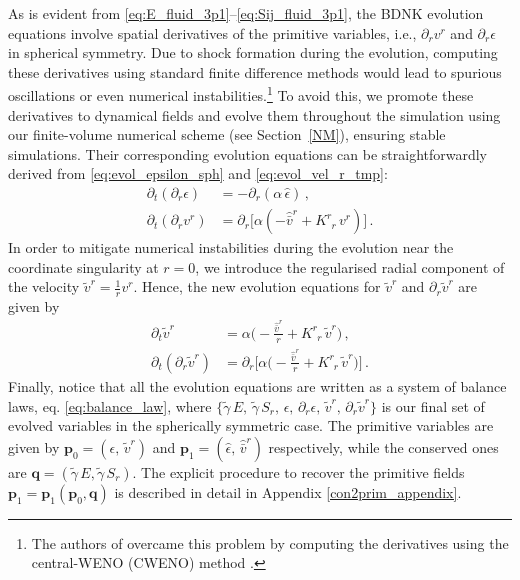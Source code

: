 \documentclass[prd,aps,twocolumn,floats,floatfix,nofootinbib,superscriptaddress] {revtex4-1}
\begin{document}
As is evident from \eqref{eq:E_fluid_3p1}--\eqref{eq:Sij_fluid_3p1}, the BDNK evolution equations involve spatial derivatives of the primitive variables, i.e.,  $\partial_rv^r$ and $\partial_r \epsilon$ in spherical symmetry.  Due to shock formation during the evolution, computing these derivatives using standard finite difference methods would lead to spurious oscillations or even numerical instabilities.\footnote{The authors of \cite{Pandya:2022pif} overcame this problem by computing the derivatives using the central-WENO (CWENO) method \cite{refId0}.} To avoid this, we promote these derivatives to dynamical fields and evolve them throughout the simulation using our finite-volume numerical scheme (see Section~\ref{NM}), ensuring stable simulations.
Their corresponding evolution equations can be straightforwardly derived from \eqref{eq:evol_epsilon_sph} and \eqref{eq:evol_vel_r_tmp}:
\begin{align}
    \partial_t(\partial_r\epsilon) &=-\partial_r(\alpha\,\hat\epsilon)\,,\\
    \partial_t (\partial_rv^r) &=\partial_r\big[\alpha(-\hat{\bar v}^r+K^r_{\phantom{r}r}\,v^r)\big]\,.
\end{align}
In order to mitigate numerical instabilities during the evolution near the coordinate singularity at $r=0$, we introduce the regularised radial component of the velocity $\tilde{v}^r=\frac{1}{r}v^r$. Hence, the new evolution equations for $\tilde{v}^r$ and $\partial_r \tilde{v}^r$ are given by
\begin{align}
    \partial_t \tilde{v}^r &=\alpha\big(-\tfrac{\hat{\bar v}^r}{r}+K^r_{\phantom{r}r}\,\tilde{v}^r\big)\,, \label{eq:evol_vel_r}\\
    \partial_t (\partial_r \tilde{v}^r) &=\partial_r\big[\alpha\big(-\tfrac{\hat{\bar v}^r}{r}+K^r_{\phantom{r}r}\,\tilde{v}^r\big)\big]\,.
\end{align} 
Finally, notice that all the evolution equations are written as a system of balance laws, eq. \eqref{eq:balance_law},
where $\{\tilde{\gamma}\,E,\,\tilde{\gamma}\,S_{r},\,\epsilon,\,\partial_{r}\epsilon,\,\tilde{v}^r, \,\partial_{r}\tilde{v}^r\}$ is our final set of evolved variables in the spherically symmetric case. The primitive variables are given by $\mathbf{p}_0=(\epsilon,\,\tilde{v}^r)$ and $\mathbf{p}_1=(\hat{\epsilon},\,\hat{\bar v}^r)$ respectively, while the conserved ones are $\mathbf{q}=(\tilde{\gamma}\,E,\tilde{\gamma}\,S_{r})$. The explicit procedure to recover the primitive fields $\mathbf{p}_1 = \mathbf{p}_1 \left(  \mathbf{p}_0,  \mathbf{q}\right)$ is described in detail in Appendix \ref{con2prim_appendix}.
\end{document}
